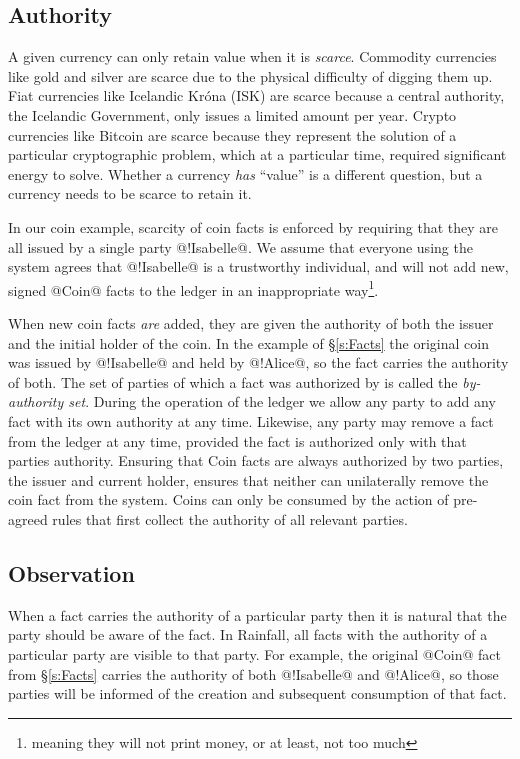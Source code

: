 \subsection{Authority}
\label{s:Authority}
A given currency can only retain value when it is \emph{scarce}. Commodity currencies like gold and silver are scarce due to the physical difficulty of digging them up. Fiat currencies like Icelandic Kr\'ona (ISK) are scarce because a central authority, the Icelandic Government, only issues a limited amount per year. Crypto currencies like Bitcoin are scarce because they represent the solution of a particular cryptographic problem, which at a particular time, required significant energy to solve. Whether a currency \emph{has} ``value'' is a different question, but a currency needs to be scarce to retain it.

In our coin example, scarcity of coin facts is enforced by requiring that they are all issued by a single party @!Isabelle@. We assume that everyone using the system agrees that @!Isabelle@ is a trustworthy individual, and will not add new, signed @Coin@ facts to the ledger in an inappropriate way\footnote{meaning they will not print money, or at least, not too much}.

When new coin facts \emph{are} added, they are given the authority of both the issuer and the initial holder of the coin. In the example of \S\ref{s:Facts} the original coin was issued by @!Isabelle@ and held by @!Alice@, so the fact carries the authority of both. The set of parties of which a fact was authorized by is called the \emph{by-authority set}. During the operation of the ledger we allow any party to add any fact with its own authority at any time. Likewise, any party may remove a fact from the ledger at any time, provided the fact is authorized only with that parties authority. Ensuring that Coin facts are always authorized by two parties, the issuer and current holder, ensures that neither can unilaterally remove the coin fact from the system. Coins can only be consumed by the action of pre-agreed rules that first collect the authority of all relevant parties.


\eject
\subsection{Observation}
\label{s:Observation}
When a fact carries the authority of a particular party then it is natural that the party should be aware of the fact. In Rainfall, all facts with the authority of a particular party are visible to that party. For example, the original @Coin@ fact from \S\ref{s:Facts} carries the authority of both @!Isabelle@ and @!Alice@, so those parties will be informed of the creation and subsequent consumption of that fact.

